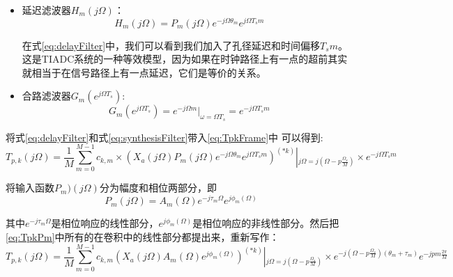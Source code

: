 		\begin{itemize}
			\item 延迟滤波器${H_m}(j\Omega )$：
				\begin{equation}
					{H_m}\left( {j\Omega } \right) = {P_m}\left( {j\Omega } \right){e^{ - j\Omega {\theta _m}}}{e^{j\Omega {T_s}m}} \label{eq:delayFilter}
				\end{equation}
		
		在式\ref{eq:delayFilter}中，我们可以看到我们加入了孔径延迟和时间偏移${T_s}m$。这是TIADC系统的一种等效模型，因为如果在时钟路径上有一点的超前其实就相当于在信号路径上有一点延迟，它们是等价的关系。
		
			\item 合路滤波器$G_m(e^{j\Omega T_s})$:
				\begin{equation}
					G_m(e^{j\Omega T_s})=e^{-j\Omega m} | _{\omega =\Omega T_s} = e^{-j\Omega T_s m}\label{eq:synthesisFilter}
				\end{equation}
		\end{itemize}
		将式\ref{eq:delayFilter}和式\ref{eq:synthesisFilter}带入\ref{eq:TpkFrame}中
		可以得到:
		 \begin{equation}
			T{ _{p,k}}\left( {j\Omega } \right) = \frac{1}{M}\sum\limits_{m = 0}^{M - 1} {{c_{k,m}} \times {{\left( {{X_a}\left( {j\Omega } \right){P_m}\left( {j\Omega } \right){e^{ - j\Omega {\theta _m}}}{e^{j\Omega {T_s}m}}} \right)}^{\left( {*k} \right)}}} \left| {_{j\Omega  = j\left( {\Omega  - p\frac{{{\Omega _s}}}{M}} \right)}} \right. \times {e^{ - j\Omega {T_s}m}} \label{eq:TpkPm}
		\end{equation}
		
		将输入函数${P_m)(j\Omega )}$分为幅度和相位两部分，即
		 \begin{equation}
			{P_m}\left( {j\Omega } \right) = {A_m}\left( \Omega  \right){e^{ - j{\tau _m}\Omega }}{e^{j{\phi _m}\left( \Omega  \right)}}
		\end{equation}
		
		其中${e^{ - j{\tau _m}\Omega }}$是相位响应的线性部分，${e^{j{\phi _m}\left( \Omega  \right)}}$是相位响应的非线性部分。然后把\ref{eq:TpkPm}中所有的在卷积中的线性部分都提出来，重新写作：
		 \begin{equation}
			{T_{p,k}}\left( {j\Omega } \right) = \frac{1}{M}\sum\limits_{m = 0}^{M - 1} {{c_{k,m}}{{\left( {{X_a}\left( {j\Omega } \right){A_m}\left( \Omega  \right){e^{j{\phi _m}\left( \Omega  \right)}}} \right)}^{\left( {*k} \right)}}\left| {_{j\Omega  = j\left( {\Omega  - p\frac{{{\Omega _s}}}{M}} \right)}} \right. \times {e^{ - j\left( {\Omega  - p\frac{{{\Omega _s}}}{M}} \right)\left( {{\theta _m} + {\tau _m}} \right)}}{e^{ - jpm\frac{{2\pi }}{M}}}}  \label{eq:TpkRewrite}
		\end{equation}
		
